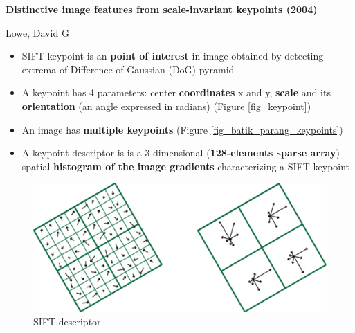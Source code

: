 \documentclass[10pt]{beamer}
\begin{document}
\begin{frame}{\cite{lowe2004distinctive}}

	\textbf{Distinctive image features from scale-invariant keypoints (2004)}
	
	{\small Lowe, David G}
	
	\begin{itemize}[<+->]
		
		\item SIFT keypoint is an \textbf{point of interest} in image obtained by detecting extrema of Difference of Gaussian (DoG) pyramid
		
		\item A keypoint has 4 parameters: center \textbf{coordinates} x and y, \textbf{scale} and its \textbf{orientation} (an angle expressed in radians) (Figure \ref{fig_keypoint})
		
		\item An image has \textbf{multiple keypoints} (Figure \ref{fig_batik_parang_keypoints})
		
		\item A keypoint descriptor is is a 3-dimensional (\textbf{128-elements sparse array}) spatial \textbf{histogram of the image gradients} characterizing a SIFT keypoint
		
	\end{itemize}

\end{frame}

\begin{frame}{\cite{lowe2004distinctive}}
	
	\begin{figure}
        \centering
        \includegraphics[width=1.0\linewidth]{sift-descriptor-1}
        \caption{SIFT descriptor}
        \label{fig_sift_descriptor_1}
    \end{figure}

\end{frame}
\end{document}
